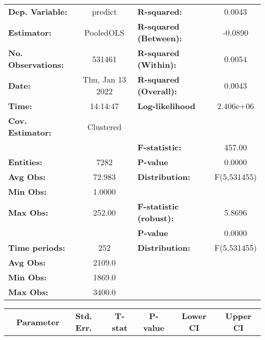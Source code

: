 \begin{center}
\begin{tabular}{lclc}
\toprule
\textbf{Dep. Variable:}    &      predict       & \textbf{  R-squared:         }   &      0.0043      \\
\textbf{Estimator:}        &     PooledOLS      & \textbf{  R-squared (Between):}  &     -0.0890      \\
\textbf{No. Observations:} &       531461       & \textbf{  R-squared (Within):}   &      0.0054      \\
\textbf{Date:}             &  Thu, Jan 13 2022  & \textbf{  R-squared (Overall):}  &      0.0043      \\
\textbf{Time:}             &      14:14:47      & \textbf{  Log-likelihood     }   &    2.406e+06     \\
\textbf{Cov. Estimator:}   &     Clustered      & \textbf{                     }   &                  \\
\textbf{}                  &                    & \textbf{  F-statistic:       }   &      457.00      \\
\textbf{Entities:}         &        7282        & \textbf{  P-value            }   &      0.0000      \\
\textbf{Avg Obs:}          &       72.983       & \textbf{  Distribution:      }   &   F(5,531455)    \\
\textbf{Min Obs:}          &       1.0000       & \textbf{                     }   &                  \\
\textbf{Max Obs:}          &       252.00       & \textbf{  F-statistic (robust):} &      5.8696      \\
\textbf{}                  &                    & \textbf{  P-value            }   &      0.0000      \\
\textbf{Time periods:}     &        252         & \textbf{  Distribution:      }   &   F(5,531455)    \\
\textbf{Avg Obs:}          &       2109.0       & \textbf{                     }   &                  \\
\textbf{Min Obs:}          &       1869.0       & \textbf{                     }   &                  \\
\textbf{Max Obs:}          &       3400.0       & \textbf{                     }   &                  \\
\bottomrule
\end{tabular}
\begin{tabular}{lcccccc}
                & \textbf{Parameter} & \textbf{Std. Err.} & \textbf{T-stat} & \textbf{P-value} & \textbf{Lower CI} & \textbf{Upper CI}  \\

\end{tabular}
\end{center}
